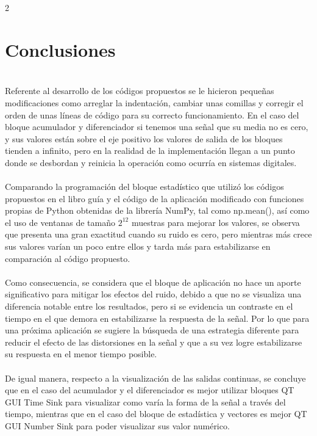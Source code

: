 \documentclass{journal}[IEEEtran, twocolumn]
\begin{document}
\begin{multicols}{2}
\section{Conclusiones}
\\
Referente al desarrollo de los códigos propuestos se le hicieron pequeñas modificaciones como arreglar la indentación, cambiar unas comillas y corregir el orden de unas líneas de código para su correcto funcionamiento. En el caso del bloque acumulador y diferenciador si tenemos una señal que su media no es cero, y sus valores están sobre el eje positivo los valores de salida de los bloques tienden a infinito, pero en la realidad de la implementación llegan a un punto donde se desbordan y  reinicia la operación como ocurría en sistemas digitales.\\\\
\noindent
Comparando la programación del bloque estadístico que utilizó los códigos propuestos en el libro guía y el código de la aplicación modificado con funciones propias de Python obtenidas de la librería NumPy, tal como np.mean(), así como el uso de ventanas de tamaño $2^{12}$ muestras para mejorar los valores, se observa que presenta una gran exactitud cuando su ruido es cero, pero mientras más crece sus valores varían un poco entre ellos y tarda más para estabilizarse en comparación al código propuesto.\\\\
\noindent
Como consecuencia, se considera que el bloque de aplicación no hace un aporte significativo para mitigar los efectos del ruido, debido a que no se visualiza una diferencia notable entre los resultados, pero si se evidencia un contraste en el tiempo en el que demora en estabilizarse la respuesta de la señal. Por lo que para una próxima aplicación se sugiere la búsqueda de una estrategia diferente para reducir el efecto de las distorsiones en la señal y que a su vez logre estabilizarse su respuesta en el menor tiempo posible.\\\\
\noindent
De igual manera, respecto a la visualización de las salidas continuas, se concluye que  en el caso del acumulador y el diferenciador es mejor utilizar bloques QT GUI Time Sink para visualizar como varía la forma de la señal a través del tiempo, mientras que en el caso del bloque de estadística y vectores  es mejor QT GUI Number Sink para poder visualizar sus valor numérico.






\end{multicols}
\end{document}
